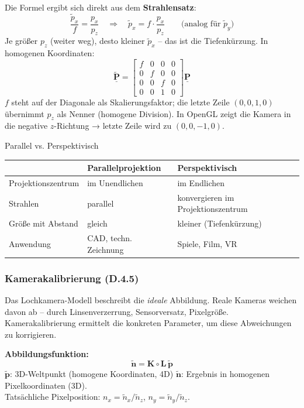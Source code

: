 \documentclass[12pt, a4paper]{article}
\begin{document}
Die Formel ergibt sich direkt aus dem \textbf{Strahlensatz}:
\[
  \frac{\tilde{p}_x}{f} = \frac{p_x}{p_z}
  \quad\Rightarrow\quad
  \tilde{p}_x = f \cdot \frac{p_x}{p_z}
  \qquad \text{(analog für } \tilde{p}_y\text{)}
\]
Je größer $p_z$ (weiter weg), desto kleiner $\tilde{p}_x$ -- das ist die Tiefenkürzung. In homogenen Koordinaten:
\[
  \tilde{\underline{\mathbf{P}}} =
  \begin{bmatrix}f&0&0&0\\0&f&0&0\\0&0&f&0\\0&0&1&0\end{bmatrix}
  \underline{\mathbf{P}}
\]
$f$ steht auf der Diagonale als Skalierungsfaktor; die letzte Zeile $(0,0,1,0)$ übernimmt $p_z$ als Nenner (homogene Division). In OpenGL zeigt die Kamera in die negative $z$-Richtung → letzte Zeile wird zu $(0,0,-1,0)$.

\begin{notebox}{Parallel vs. Perspektivisch}
\begin{tabular}{lll}
  & \textbf{Parallelprojektion} & \textbf{Perspektivisch} \\
  \hline
  Projektionszentrum & im Unendlichen & im Endlichen \\
  Strahlen & parallel & konvergieren im Projektionszentrum \\
  Größe mit Abstand & gleich & kleiner (Tiefenkürzung) \\
  Anwendung & CAD, techn. Zeichnung & Spiele, Film, VR \\
\end{tabular}
\end{notebox}

\subsubsection*{Kamerakalibrierung (D.4.5)}

Das Lochkamera-Modell beschreibt die \textit{ideale} Abbildung. Reale Kameras weichen davon ab -- durch Linsenverzerrung, Sensorversatz, Pixelgröße. Kamerakalibrierung ermittelt die konkreten Parameter, um diese Abweichungen zu korrigieren.

\textbf{Abbildungsfunktion:}
\[
  \tilde{\mathbf{n}} = \mathbf{K} \circ \mathbf{L}\,\tilde{\mathbf{p}}
\]
$\tilde{\mathbf{p}}$: 3D-Weltpunkt (homogene Koordinaten, 4D) \quad $\tilde{\mathbf{n}}$: Ergebnis in homogenen Pixelkoordinaten (3D).\\
Tatsächliche Pixelposition: $n_x = \tilde{n}_x/\tilde{n}_z$, \quad $n_y = \tilde{n}_y/\tilde{n}_z$.
\end{document}
